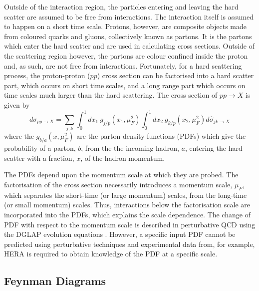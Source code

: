 Outside of the interaction region, the particles entering and leaving the hard scatter are assumed to be free from interactions. The interaction itself is assumed to happen on a short time scale.
Protons, however, are composite objects made from coloured quarks and gluons, collectively known as partons. It is the partons which enter the hard scatter and are used in calculating cross sections. Outside of the scattering region however, the partons are colour confined inside the proton and, as such, are not free from interactions. Fortunately, for a hard scattering process, the proton-proton ($pp$) cross section can be factorised into a hard scatter part, which occurs on short time scales, 
and a long range part which occurs on time scales much larger than the hard scattering. 
The cross section of $p p \rightarrow X$ is given by \cite{Seymour:2005hs}
\begin{equation} \label{ppxs}
d\sigma_{p p \rightarrow X} =  
\sum_{j,k} \int_0^1 dx_1~g_{j/p} \left(x_1,\mu_F^2 \right) \int_0^1 dx_2~g_{k/p}\left(x_2, \mu_F^2 \right)
d\hat{\sigma}_{jk\rightarrow X}
\end{equation}
where the $g_{b/a} (x,\mu_F^2)$ are the parton density functions (PDFs) which give the probability of a parton, $b$, from the the incoming hadron, $a$, entering the hard scatter with a fraction, $x$, of the hadron momentum.

The PDFs depend upon the momentum scale at which they are probed. The factorisation of the cross section necessarily introduces a momentum scale, $\mu_F$, which separates the short-time (or large momentum) scales, from the long-time (or small momentum) scales. Thus, interactions below the factorisation scale are incorporated into the PDFs, which explains the scale dependence. The change of PDF with respect to the momentum scale is described in perturbative QCD using the DGLAP evolution equations \cite{Seymour:2005hs}. However, a specific input PDF cannot be predicted using perturbative techniques and experimental data from, for example, HERA \cite{Adloff:2000qk,Raicevic:2006sp} is required to obtain knowledge of the PDF at a specific scale.

\subsection{Feynman Diagrams}


